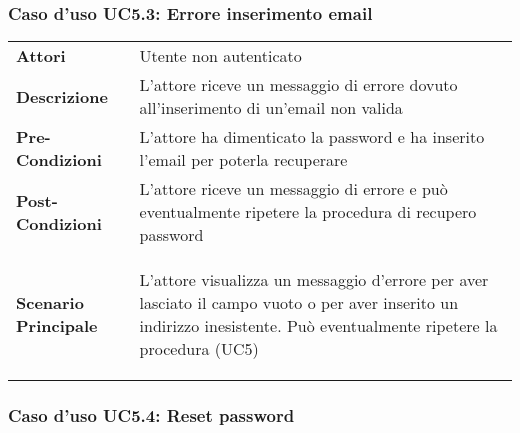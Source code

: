 \subsubsection{Caso d'uso UC5.3:  Errore inserimento email}
\label{UC5_3}

\begin{minipage}{\linewidth}
\begin{longtable}{ l | p{11cm}}
	\hline
	\rowcolor{Gray}
	 \multicolumn{2}{c}{UC5.3 - Errore inserimento email} \\
	 \hline
	\textbf{Attori} & Utente non autenticato \\
	\textbf{Descrizione} & L'attore riceve un messaggio di errore dovuto all'inserimento di un'email non valida \\
	\textbf{Pre-Condizioni} & L'attore ha dimenticato la password e ha inserito l'email per poterla recuperare\\
	\textbf{Post-Condizioni} & L'attore riceve un messaggio di errore e può eventualmente ripetere la procedura di recupero password\\
	\textbf{Scenario Principale} & \begin{enumerate*}[label=(\arabic*.),itemjoin={\newline}]
		\item L'attore visualizza un messaggio d'errore per aver lasciato il campo vuoto o per aver inserito un indirizzo inesistente. Può eventualmente ripetere la procedura (UC5)
	\end{enumerate*}\\
\end{longtable}
\end{minipage}

\subsubsection{Caso d'uso UC5.4: Reset password}
\label{UC5_4}

